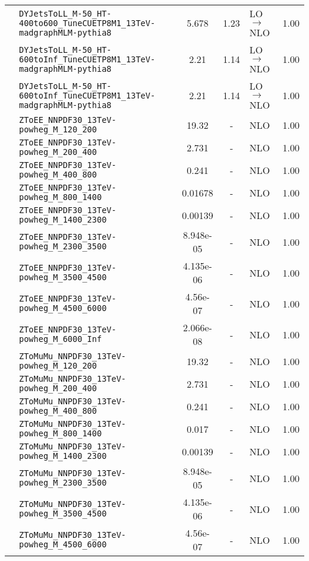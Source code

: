 \begin{longtable}{l l S[table-figures-decimal = 3, round-mode = figures, round-precision = 3] S l S}
 & \texttt{DYJetsToLL\_M-50\_HT-400to600\_TuneCUETP8M1\_13TeV-madgraphMLM-pythia8} & 5.678 & 1.23 & LO $\rightarrow$ NLO & 1.00 \\
 & \texttt{DYJetsToLL\_M-50\_HT-600toInf\_TuneCUETP8M1\_13TeV-madgraphMLM-pythia8} & 2.21 & 1.14 & LO $\rightarrow$ NLO & 1.00 \\
 & \texttt{DYJetsToLL\_M-50\_HT-600toInf\_TuneCUETP8M1\_13TeV-madgraphMLM-pythia8} & 2.21 & 1.14 & LO $\rightarrow$ NLO & 1.00 \\
 & \texttt{ZToEE\_NNPDF30\_13TeV-powheg\_M\_120\_200} & 19.32 & {-} & NLO & 1.00 \\
 & \texttt{ZToEE\_NNPDF30\_13TeV-powheg\_M\_200\_400} & 2.731 & {-} & NLO & 1.00 \\
 & \texttt{ZToEE\_NNPDF30\_13TeV-powheg\_M\_400\_800} & 0.241 & {-} & NLO & 1.00 \\
 & \texttt{ZToEE\_NNPDF30\_13TeV-powheg\_M\_800\_1400} & 0.01678 & {-} & NLO & 1.00 \\
 & \texttt{ZToEE\_NNPDF30\_13TeV-powheg\_M\_1400\_2300} & 0.00139 & {-} & NLO & 1.00 \\
 & \texttt{ZToEE\_NNPDF30\_13TeV-powheg\_M\_2300\_3500} & 8.948e-05 & {-} & NLO & 1.00 \\
 & \texttt{ZToEE\_NNPDF30\_13TeV-powheg\_M\_3500\_4500} & 4.135e-06 & {-} & NLO & 1.00 \\
 & \texttt{ZToEE\_NNPDF30\_13TeV-powheg\_M\_4500\_6000} & 4.56e-07 & {-} & NLO & 1.00 \\
 & \texttt{ZToEE\_NNPDF30\_13TeV-powheg\_M\_6000\_Inf} & 2.066e-08 & {-} & NLO & 1.00 \\
 & \texttt{ZToMuMu\_NNPDF30\_13TeV-powheg\_M\_120\_200} & 19.32 & {-} & NLO & 1.00 \\
 & \texttt{ZToMuMu\_NNPDF30\_13TeV-powheg\_M\_200\_400} & 2.731 & {-} & NLO & 1.00 \\
 & \texttt{ZToMuMu\_NNPDF30\_13TeV-powheg\_M\_400\_800} & 0.241 & {-} & NLO & 1.00 \\
 & \texttt{ZToMuMu\_NNPDF30\_13TeV-powheg\_M\_800\_1400} & 0.017 & {-} & NLO & 1.00 \\
 & \texttt{ZToMuMu\_NNPDF30\_13TeV-powheg\_M\_1400\_2300} & 0.00139 & {-} & NLO & 1.00 \\
 & \texttt{ZToMuMu\_NNPDF30\_13TeV-powheg\_M\_2300\_3500} & 8.948e-05 & {-} & NLO & 1.00 \\
 & \texttt{ZToMuMu\_NNPDF30\_13TeV-powheg\_M\_3500\_4500} & 4.135e-06 & {-} & NLO & 1.00 \\
 & \texttt{ZToMuMu\_NNPDF30\_13TeV-powheg\_M\_4500\_6000} & 4.56e-07 & {-} & NLO & 1.00 \\

\end{longtable}
